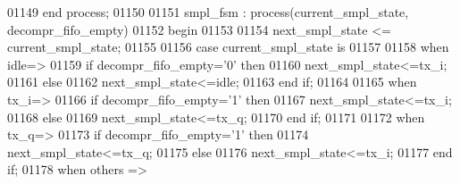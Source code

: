 \begin{DoxyCode}
01149 \textcolor{keywordflow}{end} \textcolor{keywordflow}{process};
01150 
01151 smpl\_fsm : \textcolor{keywordflow}{process}(current_smpl_state, decompr_fifo_empty)
01152 \textcolor{vhdlkeyword}{begin}
01153   
01154     \textcolor{vhdlchar}{next_smpl_state} \textcolor{vhdlchar}{<=} \textcolor{vhdlchar}{current_smpl_state};
01155     
01156     \textcolor{keywordflow}{case} \textcolor{vhdlchar}{current_smpl_state} \textcolor{keywordflow}{is}
01157 
01158       \textcolor{keywordflow}{when} \textcolor{vhdlchar}{idle}\textcolor{vhdlchar}{=}\textcolor{vhdlchar}{>}
01159        \textcolor{keywordflow}{if} \textcolor{vhdlchar}{decompr_fifo_empty}\textcolor{vhdlchar}{=}\textcolor{vhdlchar}{'}\textcolor{vhdllogic}{}\textcolor{vhdllogic}{0}\textcolor{vhdlchar}{'} \textcolor{keywordflow}{then}
01160           \textcolor{vhdlchar}{next_smpl_state}\textcolor{vhdlchar}{<=}\textcolor{vhdlchar}{tx\_i};
01161       \textcolor{keywordflow}{else}
01162           \textcolor{vhdlchar}{next_smpl_state}\textcolor{vhdlchar}{<=}\textcolor{vhdlchar}{idle};
01163       \textcolor{keywordflow}{end} \textcolor{keywordflow}{if}; 
01164    
01165       \textcolor{keywordflow}{when} \textcolor{vhdlchar}{tx\_i}\textcolor{vhdlchar}{=}\textcolor{vhdlchar}{>} 
01166           \textcolor{keywordflow}{if} \textcolor{vhdlchar}{decompr_fifo_empty}\textcolor{vhdlchar}{=}\textcolor{vhdlchar}{'}\textcolor{vhdllogic}{}\textcolor{vhdllogic}{1}\textcolor{vhdlchar}{'} \textcolor{keywordflow}{then}
01167               \textcolor{vhdlchar}{next_smpl_state}\textcolor{vhdlchar}{<=}\textcolor{vhdlchar}{tx\_i};           
01168           \textcolor{keywordflow}{else}
01169               \textcolor{vhdlchar}{next_smpl_state}\textcolor{vhdlchar}{<=}\textcolor{vhdlchar}{tx\_q};
01170           \textcolor{keywordflow}{end} \textcolor{keywordflow}{if};
01171           
01172       \textcolor{keywordflow}{when} \textcolor{vhdlchar}{tx\_q}\textcolor{vhdlchar}{=}\textcolor{vhdlchar}{>} 
01173           \textcolor{keywordflow}{if} \textcolor{vhdlchar}{decompr_fifo_empty}\textcolor{vhdlchar}{=}\textcolor{vhdlchar}{'}\textcolor{vhdllogic}{}\textcolor{vhdllogic}{1}\textcolor{vhdlchar}{'} \textcolor{keywordflow}{then}
01174               \textcolor{vhdlchar}{next_smpl_state}\textcolor{vhdlchar}{<=}\textcolor{vhdlchar}{tx\_q};
01175           \textcolor{keywordflow}{else}
01176               \textcolor{vhdlchar}{next_smpl_state}\textcolor{vhdlchar}{<=}\textcolor{vhdlchar}{tx\_i};
01177           \textcolor{keywordflow}{end} \textcolor{keywordflow}{if};  
01178       \textcolor{keywordflow}{when} \textcolor{keywordflow}{others} \textcolor{vhdlchar}{=}\textcolor{vhdlchar}{>} 

\end{DoxyCode}
